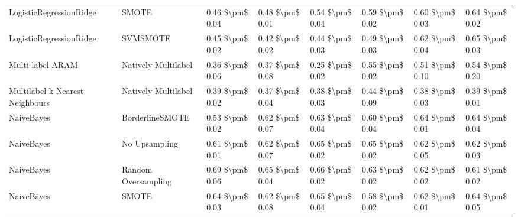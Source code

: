 \begin{tabular}{llllllll}
        LogisticRegressionRidge &                         SMOTE & 0.46 \$\textbackslash pm\$ 0.04 &           0.48 \$\textbackslash pm\$ 0.01 &       0.54 \$\textbackslash pm\$ 0.04 &        0.59 \$\textbackslash pm\$ 0.02 &                         0.60 \$\textbackslash pm\$ 0.03 & 0.64 \$\textbackslash pm\$ 0.02 \\
        LogisticRegressionRidge &                      SVMSMOTE & 0.45 \$\textbackslash pm\$ 0.02 &           0.42 \$\textbackslash pm\$ 0.02 &       0.44 \$\textbackslash pm\$ 0.03 &        0.49 \$\textbackslash pm\$ 0.03 &                         0.62 \$\textbackslash pm\$ 0.04 & 0.65 \$\textbackslash pm\$ 0.03 \\
               Multi-label ARAM &           Natively Multilabel & 0.36 \$\textbackslash pm\$ 0.06 &           0.37 \$\textbackslash pm\$ 0.08 &       0.25 \$\textbackslash pm\$ 0.02 &        0.55 \$\textbackslash pm\$ 0.02 &                         0.51 \$\textbackslash pm\$ 0.10 & 0.54 \$\textbackslash pm\$ 0.20 \\
Multilabel k Nearest Neighbours &           Natively Multilabel & 0.39 \$\textbackslash pm\$ 0.02 &           0.37 \$\textbackslash pm\$ 0.04 &       0.38 \$\textbackslash pm\$ 0.03 &        0.44 \$\textbackslash pm\$ 0.09 &                         0.38 \$\textbackslash pm\$ 0.03 & 0.39 \$\textbackslash pm\$ 0.01 \\
                     NaiveBayes &               BorderlineSMOTE & 0.53 \$\textbackslash pm\$ 0.02 &           0.62 \$\textbackslash pm\$ 0.07 &       0.63 \$\textbackslash pm\$ 0.04 &        0.60 \$\textbackslash pm\$ 0.04 &                         0.64 \$\textbackslash pm\$ 0.01 & 0.64 \$\textbackslash pm\$ 0.04 \\
                     NaiveBayes &                 No Upsampling & 0.61 \$\textbackslash pm\$ 0.01 &           0.62 \$\textbackslash pm\$ 0.07 &       0.65 \$\textbackslash pm\$ 0.02 &        0.65 \$\textbackslash pm\$ 0.02 &                         0.62 \$\textbackslash pm\$ 0.05 & 0.62 \$\textbackslash pm\$ 0.03 \\
                     NaiveBayes &           Random Oversampling & 0.69 \$\textbackslash pm\$ 0.06 &           0.65 \$\textbackslash pm\$ 0.04 &       0.66 \$\textbackslash pm\$ 0.02 &        0.63 \$\textbackslash pm\$ 0.02 &                         0.62 \$\textbackslash pm\$ 0.02 & 0.61 \$\textbackslash pm\$ 0.02 \\
                     NaiveBayes &                         SMOTE & 0.64 \$\textbackslash pm\$ 0.03 &           0.62 \$\textbackslash pm\$ 0.08 &       0.65 \$\textbackslash pm\$ 0.04 &        0.58 \$\textbackslash pm\$ 0.02 &                         0.62 \$\textbackslash pm\$ 0.01 & 0.64 \$\textbackslash pm\$ 0.05 \\

\end{tabular}
